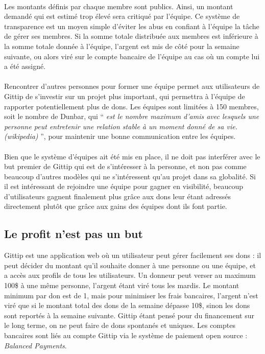 \paragraph{}
Les montants définis par chaque membre sont publics. Ainsi, un montant demandé
qui est estimé trop élevé sera critiqué par l'équipe. Ce système de
transparence est un moyen simple d'éviter les abus en confiant à l'équipe la
tâche de gérer ses membres. Si la somme totale distribuée aux membres est
inférieure à la somme totale donnée à l'équipe, l'argent est mis de côté pour
la semaine suivante, ou alors viré sur le compte bancaire de l'équipe au cas où
un compte lui a été assigné.

\paragraph{}
Rencontrer d'autres personnes pour former une équipe permet aux utilisateurs de
Gittip de s'investir sur un projet plus important, qui permettra à l'équipe de
rapporter potentiellement plus de dons. Les équipes sont limitées à 150
membres, soit le nombre de Dunbar, qui `` \emph{est le nombre maximum
d'amis avec lesquels une personne peut entretenir une relation stable à un
moment donné de sa vie. (wikipedia)} '', pour maintenir une bonne communication
entre les équipes.

\paragraph{}
Bien que le système d'équipes ait été mis en place, il ne doit pas interférer
avec le but premier de Gittip qui est de s'intéresser à la personne, et non pas
comme beaucoup d'autres modèles qui ne s'intéressent qu'au projet dans sa
globalité. Si il est intéressant de rejoindre une équipe pour gagner en
visibilité, beaucoup d'utilisateurs gagnent finalement plus grâce aux dons leur
étant adressés directement plutôt que grâce aux gains des équipes dont ils font
partie.

    \subsection{Le profit n'est pas un but}

Gittip est une application web où un utilisateur peut gérer facilement ses dons
: il peut décider du montant qu'il souhaite donner à une personne ou une
équipe, et a accès aux profils de tous les utilisateurs. Un donneur peut verser
au maximum 100\${} à une même personne, l'argent étant viré tous les mardis. Le
montant minimum par don est de 1\textcent, mais pour minimiser les frais
bancaires, l'argent n'est viré que si le montant total des dons de la semaine
dépasse 10\${}, sinon les dons sont reportés à la semaine suivante.  Gittip
étant pensé pour du financement sur le long terme, on ne peut faire de dons
spontanés et uniques. Les comptes bancaires sont liés au compte Gittip via le
système de paiement open source : \emph{Balanced Payments}.

